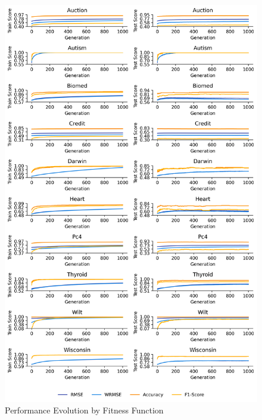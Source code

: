 
    \begin{figure}[H]
    \centering
    \includegraphics[width=\linewidth]{../Latex/Chapters/Figures/Results/RQ_Fitness_performance_evolution.png}
    \caption{Performance Evolution by Fitness Function}
    \label{fig:RQ_Fitness_performance_evolution}
    \end{figure}
    